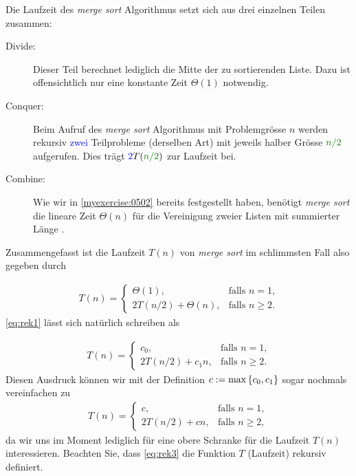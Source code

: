 Die Laufzeit des \textit{merge sort} Algorithmus setzt sich aus drei einzelnen Teilen zusammen:
\begin{description}
	\item[Divide:] Dieser Teil berechnet lediglich die Mitte der zu sortierenden Liste. Dazu ist offensichtlich nur eine konstante Zeit $\Theta(1)$ notwendig.
	\item[Conquer:] Beim Aufruf des \textit{merge sort} Algorithmus mit Problemgrösse $n$ werden rekursiv \textcolor{Blue}{zwei} Teilprobleme (derselben Art) mit jeweils halber Grösse $\textcolor{Green}{n/2}$ aufgerufen. Dies trägt $\textcolor{Blue}{2}T(\textcolor{Green}{n/2})$ zur Laufzeit bei.
	\item[Combine:] Wie wir in \cref{myexercise:0502} bereits festgestellt haben, benötigt \textit{merge sort} die lineare Zeit $\Theta(n)$ für die Vereinigung zweier Listen mit summierter Länge .
\end{description}
Zusammengefasst ist die Laufzeit $T(n)$ von \textit{merge sort} im schlimmsten Fall also gegeben durch

\begin{align}\label{eq:rek1}
	T(n) =
	\begin{cases}
		\Theta(1),           & \text{falls $n = 1$,}   \\
		2T(n/2) + \Theta(n), & \text{falls $n\geq 2$}.
	\end{cases}
\end{align}
\cref{eq:rek1} lässt sich natürlich schreiben als

\begin{align}\label{eq:rek2}
	T(n) =
	\begin{cases}
		c_0,            & \text{falls $n = 1$,}   \\
		2T(n/2) + c_1n, & \text{falls $n\geq 2$}.
	\end{cases}
\end{align}
Diesen Ausdruck können wir mit der Definition $c := \max\left\{c_0,c_1\right\}$ sogar nochmals vereinfachen zu
\begin{align}\label{eq:rek3}
	T(n) =
	\begin{cases}
		c,            & \text{falls $n = 1$,}   \\
		2T(n/2) + cn, & \text{falls $n\geq 2$},
	\end{cases}
\end{align}
da wir uns im Moment lediglich für eine obere Schranke für die Laufzeit $T(n)$ interessieren. Beachten Sie, dass \cref{eq:rek3} die Funktion $T$ (Laufzeit) rekursiv definiert.

